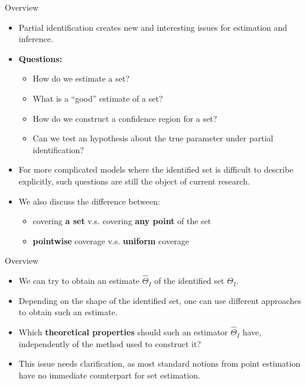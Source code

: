 \documentclass[aspectratio=169]{beamer}  %
\begin{document}
\begin{frame}{Overview}
    \begin{itemize}
        \item Partial identification creates new and interesting issues for estimation and inference.
        \item \textbf{Questions:}
            \begin{itemize}
            \item How do we estimate a set?
            \item What is a “good” estimate of a set?
            \item How do we construct a confidence region for a set?
            \item Can we test an hypothesis about the true parameter under partial identification?
            \end{itemize}
        \item For more complicated models where the identified set is difficult to
        describe explicitly, such questions are still the object of current
        research.
        \item We also discuss the difference between:
        \begin{itemize}
            \item covering \textbf{a set} v.s. covering \textbf{any point} of
            the set
            \item \textbf{pointwise} coverage v.s. \textbf{uniform} coverage
        \end{itemize}     
    \end{itemize}
\end{frame}


\begin{frame}{Overview}
    \begin{itemize}
        \item We can try to obtain an estimate $\hat{\Theta}_I$ of the identified set $\Theta_I$.
        \item Depending on the shape of the identified set, one can use different
        approaches to obtain such an estimate.
        \item Which \textbf{theoretical properties} should such an estimator $\hat{\Theta}_I$
        have, independently of the method used to construct it?
        \item This issue needs clarification, as most standard notions from point
        estimation have no immediate counterpart for set estimation.
    \end{itemize}
\end{frame}
\end{document}
